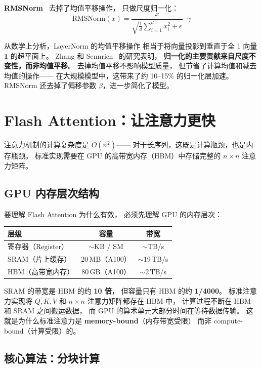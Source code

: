 \textbf{RMSNorm}~\cite{zhang2019rms} 去掉了均值平移操作，
只做尺度归一化：
\begin{equation}
  \mathrm{RMSNorm}(x) = \frac{x}{\sqrt{\frac{1}{d}\sum_{i=1}^{d} x_i^2 + \epsilon}} \cdot \gamma
\end{equation}

从数学上分析，LayerNorm 的均值平移操作
相当于将向量投影到垂直于全 1 向量 $\mathbf{1}$ 的超平面上。
Zhang 和 Sennrich~\cite{zhang2019rms} 的研究表明，
\textbf{归一化的主要贡献来自尺度不变性，而非均值平移}。
去掉均值平移不影响模型质量，
但节省了计算均值和减去均值的操作——
在大规模模型中，这带来了约 10--15\% 的归一化层加速。
RMSNorm 还去掉了偏移参数 $\beta$，进一步简化了模型。

\section{Flash Attention：让注意力更快}

注意力机制的计算复杂度是 $O(n^2)$——
对于长序列，这既是计算瓶颈，也是内存瓶颈。
标准实现需要在 GPU 的高带宽内存（HBM）中存储完整的 $n \times n$ 注意力矩阵。

\subsection{GPU 内存层次结构}

要理解 Flash Attention 为什么有效，
必须先理解 GPU 的内存层次：

\begin{center}
\begin{tabular}{lcc}
\hline
\textbf{层级} & \textbf{容量} & \textbf{带宽} \\
\hline
寄存器（Register） & $\sim$KB / SM & $\sim$TB/s \\
SRAM（片上缓存） & 20\,MB（A100） & $\sim$19\,TB/s \\
HBM（高带宽内存） & 80\,GB（A100） & $\sim$2\,TB/s \\
\hline
\end{tabular}
\end{center}

SRAM 的带宽是 HBM 的约 \textbf{10 倍}，
但容量只有 HBM 的约 \textbf{1/4000}。
标准注意力实现将 $Q, K, V$ 和 $n \times n$ 注意力矩阵都存在 HBM 中，
计算过程不断在 HBM 和 SRAM 之间搬运数据，
而 GPU 的算术单元大部分时间在等待数据传输。
这就是为什么标准注意力是 \textbf{memory-bound}（内存带宽受限）
而非 compute-bound（计算受限）的。

\subsection{核心算法：分块计算}

